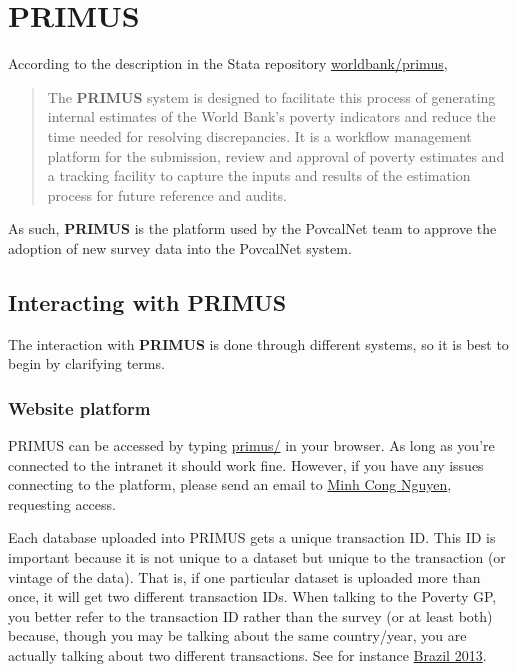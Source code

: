 \documentclass[
]{book}
\begin{document}
\hypertarget{primus}{%
\chapter{PRIMUS}\label{primus}}

According to the description in the Stata repository
\href{https://github.com/worldbank/primus}{worldbank/primus},

\begin{quote}
The \textbf{PRIMUS} system is designed to facilitate this process of generating
internal estimates of the World Bank's poverty indicators and reduce the time
needed for resolving discrepancies. It is a workflow management platform for
the submission, review and approval of poverty estimates and a tracking
facility to capture the inputs and results of the estimation process for
future reference and audits.
\end{quote}

As such, \textbf{PRIMUS} is the platform used by the PovcalNet team to approve the
adoption of new survey data into the PovcalNet system.

\hypertarget{interacting-with-primus}{%
\section{Interacting with PRIMUS}\label{interacting-with-primus}}

The interaction with \textbf{PRIMUS} is done through different systems, so it is best
to begin by clarifying terms.

\hypertarget{website-platform}{%
\subsection*{Website platform}\label{website-platform}}

PRIMUS can be accessed by typing
\href{http://spqsapps.worldbank.org/qs/primus/Pages/PRIMUShome_new.aspx}{primus/} in
your browser. As long as you're connected to the intranet it should work fine.
However, if you have any issues connecting to the platform, please send an email
to \href{mailto:mnguyen3@worldbank.org}{Minh Cong Nguyen}, requesting access.

Each database uploaded into PRIMUS gets a unique transaction ID. This ID is
important because it is not unique to a dataset but unique to the transaction
(or vintage of the data). That is, if one particular dataset is uploaded more
than once, it will get two different transaction IDs. When talking to the
Poverty GP, you better refer to the transaction ID rather than the survey (or at
least both) because, though you may be talking about the same country/year, you
are actually talking about two different transactions. See for instance \href{http://spqsapps.worldbank.org/qs/primus/Pages/PRIMUShome_new.aspx\#tab=tab3\&country=BRA\&year=2013}{Brazil
2013}.
\end{document}
